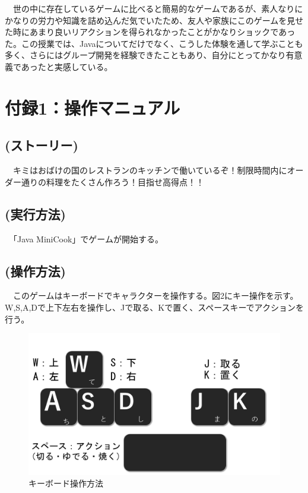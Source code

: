 \documentclass[a4j]{jsarticle} %
\begin{document}
　世の中に存在しているゲームに比べると簡易的なゲームであるが、素人なりにかなりの労力や知識を詰め込んだ気でいたため、友人や家族にこのゲームを見せた時にあまり良いリアクションを得られなかったことがかなりショックであった。この授業では、Javaについてだけでなく、こうした体験を通して学ぶことも多く、さらにはグループ開発を経験できたこともあり、自分にとってかなり有意義であったと実感している。


\newpage
\section*{付録1：操作マニュアル}
\subsection*{(ストーリー)}
　キミはおばけの国のレストランのキッチンで働いているぞ！制限時間内にオーダー通りの料理をたくさん作ろう！目指せ高得点！！
\subsection*{(実行方法)}
　「Java MiniCook」でゲームが開始する。
\subsection*{(操作方法)}
　このゲームはキーボードでキャラクターを操作する。図2にキー操作を示す。W,S,A,Dで上下左右を操作し、Jで取る、Kで置く、スペースキーでアクションを行う。
\begin{figure}[H]
  \begin{center}
  \includegraphics[scale=0.2]{img/key.png}
  \caption{キーボード操作方法}
  \end{center}
\end{figure}
\end{document}
